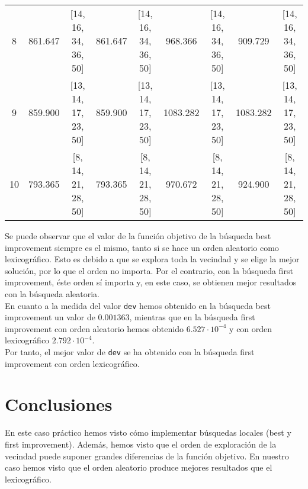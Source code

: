 \documentclass[12pt,a4paper,twoside,openright,titlepage,final]{article}
\begin{document}
\begin{table}[htbp!]
{\begin{tabular}{@{}ccccccccc@{}}
			8                          & 861.647          & {[}14, 16, 34, 36, 50{]} & 861.647          & {[}14, 16, 34, 36, 50{]} & 968.366          & {[}14, 16, 34, 36, 50{]} & 909.729          & {[}14, 16, 34, 36, 50{]} \\
			9                          & 859.900          & {[}13, 14, 17, 23, 50{]} & 859.900          & {[}13, 14, 17, 23, 50{]} & 1083.282         & {[}13, 14, 17, 23, 50{]} & 1083.282         & {[}13, 14, 17, 23, 50{]} \\
			10                         & 793.365          & {[}8, 14, 21, 28, 50{]}  & 793.365          & {[}8, 14, 21, 28, 50{]}  & 970.672          & {[}8, 14, 21, 28, 50{]}  & 924.900          & {[}8, 14, 21, 28, 50{]}  \\ \bottomrule
		\end{tabular}%
	}
\end{table}

Se puede observar que el valor de la función objetivo de la búsqueda best improvement siempre es el mismo, tanto si se hace un orden aleatorio como lexicográfico. Esto es debido a que se explora toda la vecindad y se elige la mejor solución, por lo que el orden no importa. Por el contrario, con la búsqueda first improvement, éste orden sí importa y, en este caso, se obtienen mejor resultados con
la búsqueda aleatoria.\\

En cuanto a la medida del valor \texttt{dev} hemos obtenido en la búsqueda best improvement un valor de $0.001363$, mientras que en la búsqueda first improvement con orden aleatorio hemos obtenido $6.527\cdot 10^{-4}$ y con orden lexicográfico $2.792 \cdot 10^{-4}$.\\

Por tanto, el mejor valor de \texttt{dev} se ha obtenido con la búsqueda first improvement con orden lexicográfico.
\section{Conclusiones}

En este caso práctico hemos visto cómo implementar búsquedas locales (best y first improvement). Además, hemos visto que el orden de exploración de la vecindad puede suponer grandes diferencias de la función objetivo. En nuestro caso hemos visto que el orden aleatorio produce mejores resultados que el lexicográfico.  
\end{document}
